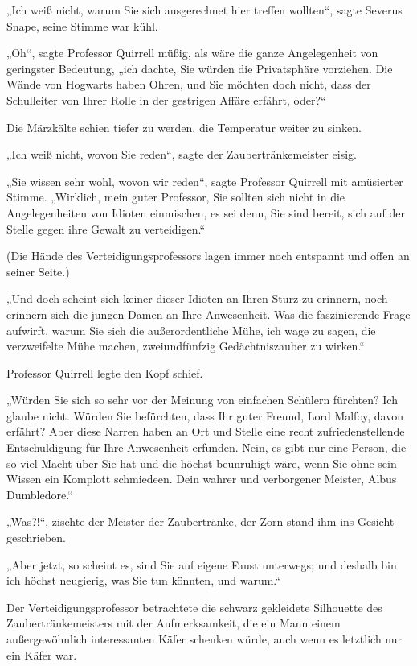 {„Ich weiß nicht, warum Sie sich ausgerechnet hier treffen wollten“, sagte Severus Snape, seine Stimme war kühl.

„Oh“, sagte Professor Quirrell müßig, als wäre die ganze Angelegenheit von geringster Bedeutung, „ich dachte, Sie würden die Privatsphäre vorziehen. Die Wände von Hogwarts haben Ohren, und Sie möchten doch nicht, dass der Schulleiter von Ihrer Rolle in der gestrigen Affäre erfährt, oder?“

Die Märzkälte schien tiefer zu werden, die Temperatur weiter zu sinken.

„Ich weiß nicht, wovon Sie reden“, sagte der Zaubertränkemeister eisig.

„Sie wissen sehr wohl, wovon wir reden“, sagte Professor Quirrell mit amüsierter Stimme. „Wirklich, mein guter Professor, Sie sollten sich nicht in die Angelegenheiten von Idioten einmischen, es sei denn, Sie sind bereit, sich auf der Stelle gegen ihre Gewalt zu verteidigen.“

(Die Hände des Verteidigungsprofessors lagen immer noch entspannt und offen an seiner Seite.)

„Und doch scheint sich keiner dieser Idioten an Ihren Sturz zu erinnern, noch erinnern sich die jungen Damen an Ihre Anwesenheit. Was die faszinierende Frage aufwirft, warum Sie sich die außerordentliche Mühe, ich wage zu sagen, die verzweifelte Mühe machen, zweiundfünfzig Gedächtniszauber zu wirken.“

Professor Quirrell legte den Kopf schief.

„Würden Sie sich so sehr vor der Meinung von einfachen Schülern fürchten? Ich glaube nicht. Würden Sie befürchten, dass Ihr guter Freund, Lord Malfoy, davon erfährt? Aber diese Narren haben an Ort und Stelle eine recht zufriedenstellende Entschuldigung für Ihre Anwesenheit erfunden. Nein, es gibt nur eine Person, die so viel Macht über Sie hat und die höchst beunruhigt wäre, wenn Sie ohne sein Wissen ein Komplott schmiedeen. Dein wahrer und verborgener Meister, Albus Dumbledore.“

„Was?!“, zischte der Meister der Zaubertränke, der Zorn stand ihm ins Gesicht geschrieben.

„Aber jetzt, so scheint es, sind Sie auf eigene Faust unterwegs; und deshalb bin ich höchst neugierig, was Sie tun könnten, und warum.“

Der Verteidigungsprofessor betrachtete die schwarz gekleidete Silhouette des Zaubertränkemeisters mit der Aufmerksamkeit, die ein Mann einem außergewöhnlich interessanten Käfer schenken würde, auch wenn es letztlich nur ein Käfer war.

}
